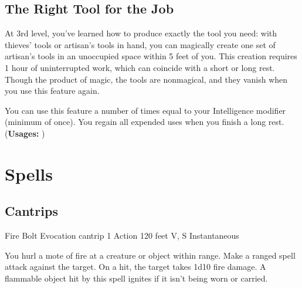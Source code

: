 {%
\subsection*{The Right Tool for the Job}
At 3rd level, you've learned how to produce exactly the tool you need: with thieves' tools or artisan's tools in hand, you can magically create one set of artisan's tools in an unoccupied space within 5 feet of you. This creation requires 1 hour of uninterrupted work, which can coincide with a short or long rest. Though the product of magic, the tools are nonmagical, and they vanish when you use this feature again.

You can use this feature a number of times equal to your Intelligence modifier (minimum of once). You regain all expended uses when you finish a long rest.\\
(\textbf{Usages: })

\section*{Spells}
\subsection*{Cantrips}

\DndSpellHeader
	{Fire Bolt}
	{Evocation cantrip}
	{1 Action}
	{120 feet}
	{V, S}
	{Instantaneous}

You hurl a mote of fire at a creature or object within range. Make a ranged spell attack against the target. On a hit, the target takes 1d10 fire damage. A flammable object hit by this spell ignites if it isn’t being worn or carried.

}
